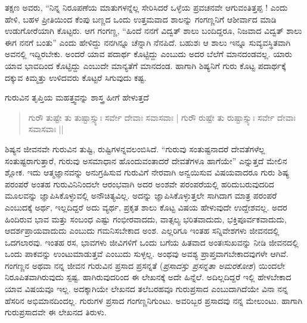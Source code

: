 {ತಕ್ಷಣ ಅವರು, “ನಿನ್ನ ನಿರೂಪಣೆಯ ಮಾತುಗಳನ್ನೆಲ್ಲ ಸೇರಿಸಿದರೆ ಒಳ್ಳೆಯ ಪ್ರವಚನವೇ ಆಗುವಂತಿತ್ತಪ್ಪ ! ಎಂದು ಹೇಳಿ, ಬಹಳ ಪ್ರೀತಿಯಿಂದ ಕೆಂಪು ಬಣ್ಣದ ಒಂದು ಉತ್ತಮವಾದ ಶಾಲನ್ನು ಗಂಗಣ್ಣನಿಗೆ ಆಶೀರ್ವಾದ ಮಾಡಿ ಉಡುಗೋರೆಯಾಗಿ ಕೊಟ್ಟರು. ಆಗ ಗಂಗಣ್ಣ, “ಹಿಂದೆ ನನಗೆ ವಿದ್ವತ್ ಶಾಲು ಬಂದಿದ್ದರೂ, ನಿಜವಾದ ವಿದ್ವತ್ ಶಾಲು ಈಗ ನನಗೆ ಬಂತು” ಎಂದು ಹೇಳಿದ್ದು ನನಗಿನ್ನೂ ಚೆನ್ನಾಗಿ ನೆನಪಿದೆ. ಬಹುಶಃ ಆ ಶಾಲು ಇನ್ನೂ ಸುವ್ಯವಸ್ಥಿತವಾಗಿ ಅವನಲ್ಲಿ ಇದ್ದಿರಬೇಕು. ಅಂದರೆ ಯಾವ ಪದಾರ್ಥ ಕೊಟ್ಟಿದ್ದು ಎಂಬುದು ಅದರ ಬೆಲೆಗೆ ಮಾನದಂಡವಲ್ಲ. ಯಾರು ಯಾವ ಭಾವದಿಂದ ಕೊಟ್ಟಿದ್ದು ಎಂಬುದೇ ಮಾನ್ಯತೆಗೆ ಮಾನದಂಡ. ಹಾಗಾಗಿ ಶಿಷ್ಯನಿಗೆ ಗುರು ಕೊಟ್ಟ ಪದಾರ್ಥಕ್ಕೆ ದಕ್ಕುವ ಕಿಮ್ಮತ್ತು ಉಳಿದವರು ಕೊಟ್ಟರೆ ಸಿಗುವುದು ಕಷ್ಟ. 

ಗುರುವಿನ ತೃಪ್ತಿಯ ಮಹತ್ತ್ವವನ್ನು ಶಾಸ್ತ್ರ ಹೀಗೆ ಹೇಳುತ್ತದೆ \enginline{-} 
\begin{verse}
ಗುರೌ ತುಷ್ಟೇ ತು ತುಷ್ಟಾಸ್ಸ್ಯುಃ ಸರ್ವೇ ದೇವಾಃ ಸವಾಸವಾಃ | 
ಗುರೌ ರುಷ್ಟೇ ತು ರುಷ್ಟಾಸ್ಸ್ಯುಃ ಸರ್ವೇ ದೇವಾಃ ಸವಾಸವಾಃ ||
\end{verse}
ಶಿಷ್ಯನ ಜೀವನವೇ ಗುರುವಿನ ತುಷ್ಟಿ, ರುಷ್ಟಿಗಳನ್ನವಲಂಬಿಸಿದೆ. “ಗುರುವು ಸಂತುಷ್ಟನಾದರೆ ದೇವತೆಗಳೆಲ್ಲ ಸಂತುಷ್ಟರಾಗುತ್ತಾರೆ, ಗುರುವು ಅಸಮಾಧಾನ ಹೊಂದುವಂತಾದರೆ ದೇವತೆಗಳೂ ಹಾಗೆಯೇ” ಎನ್ನುತ್ತದೆ ಮೇಲಿನ ಶ್ಲೋಕ. ಇದು ಆತ್ಮಜ್ಞಾನವನ್ನು ಅನುಗ್ರಹಿಸುವ ಗುರುವಿಗೆ ನೇರವಾಗಿ ಅನ್ವಯಿಸುವ ವಿಷಯವಾದರೂ ಗುರು ಶಿಷ್ಯ ಪರಂಪರೆ ಅಂತಹ ಗುರುವಿನಿನಿಂದಲೇ ಆರಂಭವಾಗಿ ಅದರ ಅಂಶವೇ ಪರಂಪರೆಯಲ್ಲಿ ಹರಿದುಬರುವುದರಿದ  ಮೂಲವನ್ನು ಜ್ಞಾಪಿಸಿಕೊಳ್ಳುವಲ್ಲಿ ಅನೌಚಿತ್ಯವಿಲ್ಲ. ಅದನ್ನು ಜ್ಞಾಪಿಸಿಕೊಳ್ಳುತ್ತಲೇ ಸಾಗಿದಾಗ ಮಾತ್ರ ಪರಂಪರೆ ಎಂಬುದಕ್ಕೆ ಅರ್ಥ, ಇಲ್ಲದಿದ್ದರೆ ಅದು ವ್ಯರ್ಥ,  ಪ್ರಕೃತ ಶಾಲು ಕೊಟ್ಟ ವಿಷಯ ಹೇಳುವುದೇ ಉದ್ದೇಶವಲ್ಲ. ಅದರ ಹಿಂದಿರುವ ಭಾವ ಮತ್ತು ಸಂಬಂಧ ಎಷ್ಟು ಗಂಭೀರವಾದದು, ವಾತ್ಸಲ್ಯ ಭರಿತವಾದುದು, ಭಕ್ತಿಪೂರ್ವಕವಾದುದು, ಆದರ್ಶಪ್ರಾಯವಾದುದು ಎಂಬುದು ಗಮನಿಸಬೇಕಾದ ಅಂಶ. ಎಲ್ಲರಿಗೂ ಇಂತಹ ಸನ್ನಿವೇಶಗಳು ಜೀವನದಲ್ಲಿ ಒದಗಲಾರವು. ಇಂತಹ ರಸ, ಭಾವಗಳು ಜೀವಿಗಳಿಗೆ ಒಂದು ಬಗೆಯ ಹಿತವಾದ ಅಂತಃಸುಖವನ್ನು ನೀಡಿ  ಜೀವನದಲ್ಲಿ ಒಂದು ಪಾಕವನ್ನು ಉಂಟುಮಾಡುತ್ತವೆ ಎಂಬುದು ಸುಳ್ಳಲ್ಲ. ಅಂಥವು ಅವಶ್ಯ ಪ್ರಾಪ್ತವಾಗಬೇಕಾದವುಗಳೇ ಆಗಿವೆ. ಗಂಗಣ್ಣನ ಅಥವಾ ನನ್ನ ಜೀವನ ಗುರುವಿನ ಪ್ರಸಾದ \enginline{-} ಪ್ರಸನ್ನತೆ (\textit{ಪ್ರಸಾದಸ್ತು ಪ್ರಸನ್ನತಾ \enginline{-} ಅಮರಕೋಶ}) ಯಿಂದಲೇ ನಿರೂಪಿತವಾಗಿರುವುದು ಸ್ಪಷ್ಟ. ಹಾಗಿರುವುದರಿಂದ ಈ ಲೇಖನಕ್ಕೆ ಅದೇ ಹಿನ್ನೆಲೆ. ಅದಿಲ್ಲದಿದ್ದರೆ ಇಲ್ಲಿ ಹೇಳಬೇಕಾದ ಯಾವ ವಿಷಯವೂ ಇಲ್ಲ. ಅದಕ್ಕಾಗಿಯೇ ಲೇಖನದ ತಲೆಬರಹವೂ ಗುರುಪ್ರಸಾದ ಎಂಬುದಾಗಿದೆಯೇ ವಿನಾ ನನ್ನ ಹೆಸರಿನ ಅಭಿಮಾನದಿಂದಲ್ಲ. ಗುರುಗಳ ಪ್ರಸಾದ ಗಂಗಣ್ಣನಿಗುಂಟು. ಅವರಿಬ್ಬರ ಪ್ರಸಾದವು ನನ್ನ ಮೇಲುಂಟು. ಹಾಗಾಗಿ ಗುರು\enginline{-}ಪ್ರಸಾದವೇ ಈ ಲೇಖನದ ತಿರುಳು. 

}
